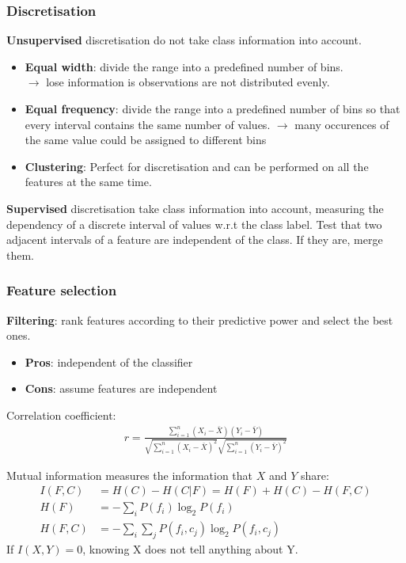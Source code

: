 \subsubsection*{Discretisation}
\textbf{Unsupervised} discretisation do not take class information into account.
\begin{itemize}
	\item \textbf{Equal width}: divide the range into a predefined number of bins.\\
	$\rightarrow$ lose information is observations are not distributed evenly.
	\item \textbf{Equal frequency}: divide the range into a predefined number of bins so that every interval contains the same number of values.
	$\rightarrow$ many occurences of the same value could be assigned to different bins
	\item \textbf{Clustering}: Perfect for discretisation and can be performed on all the features at the same time.
\end{itemize}

\textbf{Supervised} discretisation take class information into account, measuring the dependency of a discrete interval of values w.r.t the class label. Test that two adjacent intervals of a feature are independent of the class. If they are, merge them.

\subsubsection*{Feature selection}
\textbf{Filtering}: rank features according to their predictive power and select the best ones.
\begin{itemize}
	\item \textbf{Pros}: independent of the classifier
	\item \textbf{Cons}: assume features are independent
\end{itemize}


Correlation coefficient:
\begin{align*}
	r = \frac{\sum_{i = 1}^n (X_i - \bar{X})(Y_i - \bar{Y})}{\sqrt{\sum_{i = 1}^n (X_i - \bar{X})^2} \sqrt{\sum_{i = 1}^n (Y_i - \bar{Y})^2}}
\end{align*}

Mutual information measures the information that $X$ and $Y$ share:
\begin{align*}
	I(F, C) &= H(C) - H(C | F) = H(F) + H(C) - H(F, C)\\
	H(F) &= - \sum_i P(f_i) \log_2 P(f_i)\\
	H(F, C) &= - \sum_i \sum_j P(f_i, c_j) \log_2 P(f_i, c_j)
\end{align*}
If $I(X, Y) = 0$, knowing X does not tell anything about Y.

